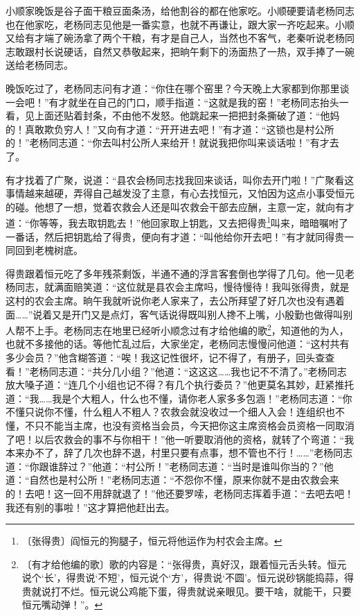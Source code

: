 \documentclass[12pt,UTF-8,openany]{ctexbook}
\begin{document}
\begin{normalsize}
    小顺家晚饭是谷子面干粮豆面条汤，给他割谷的都在他家吃。小顺硬要请老杨同志也在他家吃，老杨同志见他是一番实意，也就不再谦让，跟大家一齐吃起来。小顺又给有才端了碗汤拿了两个干粮，有才是自己人，当然也不客气，老秦听说老杨同志敢跟村长说硬话，自然又恭敬起来，把晌午剩下的汤面热了一热，双手捧了一碗送给老杨同志。
    
    晚饭吃过了，老杨同志问有才道：“你住在哪个窑里？今天晚上大家都到你那里谈一会吧！”有才就坐在自己的门口，顺手指道：“这就是我的窑！”老杨同志抬头一看，见上面还贴着封条，不由他不发怒。他跳起来一把把封条撕破了道：“他妈的！真敢欺负穷人！”又向有才道：“开开进去吧！”有才道：“这锁也是村公所的！”老杨同志道：“你去叫村公所人来给开！就说我把你叫来谈话啦！”有才去了。
    
    有才找着了广聚，说道：“县农会杨同志找我回来谈话，叫你去开门啦！”广聚看这事情越来越硬，弄得自己越发没了主意，有心去找恒元，又怕因为这点小事受恒元的碰。他想了一想，觉着农救会人还是叫农救会干部去应酬，主意一定，就向有才道：“你等等，我去取钥匙去！”他回家取上钥匙，又去把得贵\footnote{〔张得贵〕阎恒元的狗腿子，恒元将他运作为村农会主席。}叫来，暗暗嘱咐了一番话，然后把钥匙给了得贵，便向有才道：“叫他给你开去吧！”有才就同得贵一同回到老槐树底。
    
    得贵跟着恒元吃了多年残茶剩饭，半通不通的浮言客套倒也学得了几句。他一见老杨同志，就满面赔笑道：“这位就是县农会主席吗，慢待慢待！我叫张得贵，就是这村的农会主席。晌午我就听说你老人家来了，去公所拜望了好几次也没有遇着面……”说着又是开门又是点灯，客气话说得既叫别人搀不上嘴，小殷勤也做得叫别人帮不上手。老杨同志在地里已经听小顺念过有才给他编的歌\footnote{〔有才给他编的歌〕歌的内容是：“张得贵，真好汉，跟着恒元舌头转。恒元说个‘长’，得贵说‘不短’，恒元说个‘方’，得贵说‘不圆’。恒元说砂锅能捣蒜，得贵就说打不烂。恒元说公鸡能下蛋，得贵就说亲眼见。要干啥，就能干，只要恒元嘴动弹！”。}，知道他的为人，也就不多接他的话。等他忙乱过后，大家坐定，老杨同志慢慢问他道：“这村共有多少会员？”他含糊答道：“唉！我这记性很坏，记不得了，有册子，回头查查看！”老杨同志道：“共分几小组？”他道：“这这这……我也记不不清了。”老杨同志放大嗓子道：“连几个小组也记不得？有几个执行委员？”他更莫名其妙，赶紧推托道：“我……我是个大粗人，什么也不懂，请你老人家多多包涵！”老杨同志道：“你不懂只说你不懂，什么粗人不粗人？农救会就没收过一个细人入会！连组织也不懂，不只不能当主席，也没有资格当会员，今天把你这主席资格会员资格一同取消了吧！以后农救会的事不与你相干！”他一听要取消他的资格，就转了个弯道：“我本来办不了，辞了几次也辞不退，村里只要有点事，想不管也不行！……”老杨同志道：“你跟谁辞过？”他道：“村公所！”老杨同志道：“当时是谁叫你当的？”他道：“自然也是村公所！”老杨同志道：“不怨你不懂，原来你就不是由农救会来的！去吧！这一回不用辞就退了！”他还要罗嗦，老杨同志挥着手道：“去吧去吧！我还有别的事啦！”这才算把他赶出去。
    

\end{normalsize}
\end{document}
